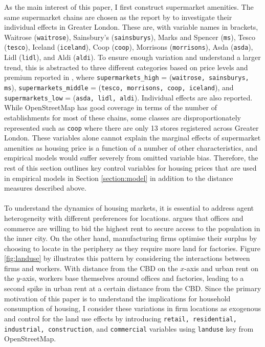 \documentclass{article}
\begin{document}
As the main interest of this paper, I first construct supermarket amenities. The same supermarket chains are chosen as the report by \citet{LloydsBank2016LivingHome} to investigate their individual effects in Greater London. These are, with variable names in brackets, Waitrose (\texttt{waitrose}), Sainsbury's (\texttt{sainsburys}), Marks and Spencer (\texttt{ms}), Tesco (\texttt{tesco}), Iceland (\texttt{iceland}), Coop (\texttt{coop}), Morrisons (\texttt{morrisons}), Asda (\texttt{asda}), Lidl (\texttt{lidl}), and Aldi (\texttt{aldi}). To ensure enough variation and understand a larger trend, this is abstracted to three different categories based on price levels and premium reported in \citet{LloydsBank2016LivingHome}, where \texttt{supermarkets\_high} = (\texttt{waitrose, sainsburys, ms}), \texttt{supermarkets\_middle} = (\texttt{tesco, morrisons, coop, iceland}), and \texttt{supermarkets\_low} = (\texttt{asda, lidl, aldi}). Individual effects are also reported. While OpenStreetMap has good coverage in terms of the number of establishments for most of these chains, some classes are disproportionately represented such as \texttt{coop} where there are only 13 stores registered across Greater London. These variables alone cannot explain the marginal effects of supermarket amenities as housing price is a function of a number of other characteristics, and empirical models would suffer severely from omitted variable bias. Therefore, the rest of this section outlines key control variables for housing prices that are used in empirical models in Section \ref{section:model} in addition to the distance measures described above.\\\\
To understand the dynamics of housing markets, it is essential to address agent heterogeneity with different preferences for locations. \citet{AlonsoWilliam1964Lalu} argues that offices and commerce are willing to bid the highest rent to secure access to the population in the inner city. On the other hand, manufacturing firms optimise their surplus by choosing to locate in the periphery as they require more land for factories. Figure \ref{fig:landuse} by \citet{OSullivan2011UrbanEconomics} illustrates this pattern by considering the interactions between firms and workers. With distance from the CBD on the $x$-axis and urban rent on the $y$-axis, workers base themselves around offices and factories, leading to a second spike in urban rent at a certain distance from the CBD. Since the primary motivation of this paper is to understand the implications for household consumption of housing, I consider these variations in firm locations as exogenous and control for the land use effects by introducing \texttt{retail, residential, industrial, construction}, and \texttt{commercial} variables using \texttt{landuse} key from OpenStreetMap.
\end{document}
